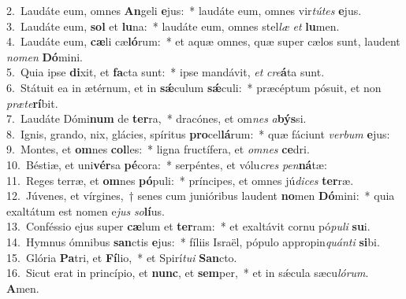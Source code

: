 {2.~}Laudáte eum, omnes \textbf{An}geli \textbf{e}jus:~* laudáte eum, omnes vir\textit{tú}\textit{tes} \textbf{e}jus.\\
{3.~}Laudáte eum, \textbf{sol} et \textbf{lu}na:~* laudáte eum, omnes stel\textit{læ} \textit{et} \textbf{lu}men.\\
{4.~}Laudáte eum, \textbf{cæ}li cæ\textbf{ló}rum:~* et aquæ omnes, quæ super cælos sunt, laudent \textit{no}\textit{men} \textbf{Dó}mini.\\
{5.~}Quia ipse \textbf{di}xit, et \textbf{fa}cta sunt:~* ipse mandávit, \textit{et} \textit{cre}\textbf{á}ta sunt.\\
{6.~}Státuit ea in ætérnum, et in \textbf{sǽ}culum \textbf{sǽ}culi:~* præcéptum pósuit, et non \textit{præ}\textit{te}\textbf{rí}bit.\\
{7.~}Laudáte Dómi\textbf{num} de \textbf{ter}ra,~* dracónes, et om\textit{nes} \textit{a}\textbf{býs}si.\\
{8.~}Ignis, grando, nix, glácies, spíritus \textbf{pro}cel\textbf{lá}rum:~* quæ fáciunt \textit{ver}\textit{bum} \textbf{e}jus:\\
{9.~}Montes, et \textbf{om}nes \textbf{col}les:~* ligna fructífera, et \textit{om}\textit{nes} \textbf{ce}dri.\\
{10.~}Béstiæ, et uni\textbf{vér}sa \textbf{pé}cora:~* serpéntes, et vólu\textit{cres} \textit{pen}\textbf{ná}tæ:\\
{11.~}Reges terræ, et \textbf{om}nes \textbf{pó}puli:~* príncipes, et omnes jú\textit{di}\textit{ces} \textbf{ter}ræ.\\
{12.~}Júvenes, et vírgines,~† senes cum junióribus laudent \textbf{no}men \textbf{Dó}mini:~* quia exaltátum est nomen e\textit{jus} \textit{so}\textbf{lí}us.\\
{13.~}Conféssio ejus super \textbf{cæ}lum et \textbf{ter}ram:~* et exaltávit cornu pó\textit{pu}\textit{li} \textbf{su}i.\\
{14.~}Hymnus ómnibus \textbf{san}ctis \textbf{e}jus:~* fíliis Israël, pópulo appropin\textit{quán}\textit{ti} \textbf{si}bi.\\
{15.~}Glória \textbf{Pa}tri, et \textbf{Fí}lio,~* et Spirí\textit{tu}\textit{i} \textbf{San}cto.\\
{16.~}Sicut erat in princípio, et \textbf{nunc}, et \textbf{sem}per,~* et in sǽcula sæcu\textit{ló}\textit{rum}. \textbf{A}men.\\
